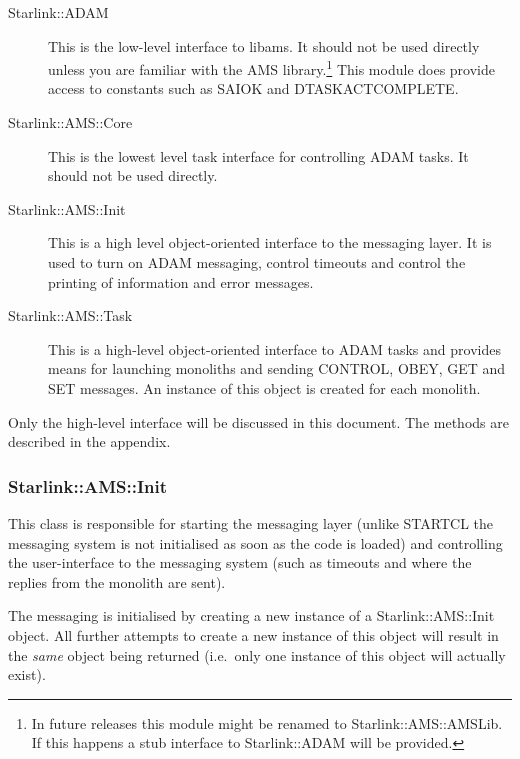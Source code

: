 \documentclass[twoside,11pt]{article}
\newcommand{\xref}[3]{#1}
\renewcommand{\_}{\texttt{\symbol{95}}}
\begin{document}
\begin{description}
\item[Starlink::ADAM]

This is the low-level interface to libams. It should not be used directly
unless you are familiar with the AMS library.\footnote{In future releases this
module might be renamed to Starlink::AMS::AMSLib. If this happens a stub
interface to Starlink::ADAM will be provided.} This module does provide
access to constants such as SAI\_\_OK and DTASK\_\_ACTCOMPLETE.

\item[Starlink::AMS::Core]

This is the lowest level task interface for controlling ADAM tasks. It should
not be used directly.

\item[Starlink::AMS::Init]

This is a high level object-oriented interface to the messaging layer. It is
used to turn on ADAM messaging, control timeouts and control the printing
of information and error messages.

\item[Starlink::AMS::Task]

This is a high-level object-oriented interface to ADAM tasks and provides
means for launching monoliths and sending CONTROL, OBEY, GET and SET
messages. An instance of this object is created for each monolith.

\end{description}

Only the high-level interface will  be discussed in this document.
The methods are described in the appendix.

\subsubsection{Starlink::AMS::Init}


This class is responsible for starting the messaging layer (unlike
\xref{STARTCL}{sun186}{} the messaging system is not initialised as soon as
the code is loaded) and controlling the user-interface to the messaging system
(such as timeouts and where the replies from the monolith are sent).

The messaging is initialised by creating a new instance of
a Starlink::AMS::Init object. All further attempts to create a new
instance of this object will result in the \emph{same} object being
returned (i.e.\ only one instance of this object will actually exist).
\end{document}
